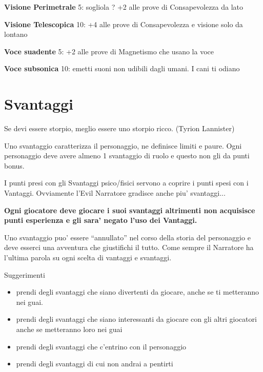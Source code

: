 \documentclass[a4paper,11pt,twoside,openany]{dndbook}
\begin{document}
{\textbf{Visione Perimetrale} 5: sogliola ? +2 alle prove di Consapevolezza da lato

\textbf{Visione Telescopica} 10: +4 alle prove di Consapevolezza e visione solo da lontano

\textbf{Voce suadente} 5: +2 alle prove di Magnetismo che usano la voce

\textbf{Voce subsonica} 10: emetti suoni non udibili dagli umani. I cani ti odiano

\pagebreak

\section{Svantaggi}

\label{svantaggi}
\begin{quotebox}
Se devi essere storpio, meglio essere uno storpio ricco. (Tyrion Lannister)\end{quotebox}

Uno svantaggio caratterizza il personaggio, ne definisce limiti e paure. Ogni personaggio deve avere almeno 1 svantaggio di ruolo e questo non gli da punti bonus.

I punti presi con gli Svantaggi psico/fisici servono a coprire i punti spesi con i Vantaggi. Ovviamente l'Evil Narratore gradisce anche piu' svantaggi...

\textbf{Ogni giocatore deve giocare i suoi svantaggi altrimenti non acquisisce punti esperienza e gli sara' negato l'uso dei Vantaggi.}

Uno svantaggio puo' essere ``annullato'' nel corso della storia del personaggio e deve esserci una avventura che giustifichi il tutto. Come sempre il Narratore ha l'ultima parola su ogni scelta di vantaggi e svantaggi.

\bigskip

Suggerimenti
\begin{itemize}
\item 
prendi degli svantaggi che siano divertenti da giocare, anche se ti metteranno nei guai. 
\item 
prendi degli svantaggi che siano interessanti da giocare con gli altri giocatori anche se metteranno loro nei guai 
\item 
prendi degli svantaggi che c'entrino con il personaggio 
\item 
prendi degli svantaggi di cui non andrai a pentirti 
\end{itemize}

}
\end{document}
